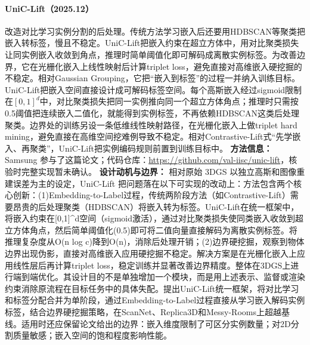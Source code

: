 \paragraph{UniC-Lift（2025.12）\cite{2512_24763}}
改造对比学习实例分割的后处理。传统方法学习嵌入后还要用HDBSCAN等聚类把嵌入转标签，慢且不稳定。UniC-Lift把嵌入约束在超立方体中，用对比聚类损失让同实例嵌入收敛到角点，推理时简单阈值化即可解码成离散实例标签。为改善边界，它在光栅化嵌入上线性映射后计算triplet loss，避免直接对高维嵌入硬挖掘的不稳定。相对Gaussian Grouping，它把“嵌入到标签”的过程一并纳入训练目标。
UniC-Lift把嵌入空间直接设计成可解码标签空间。每个高斯嵌入经过sigmoid限制在$[0,1]^d$中，对比聚类损失把同一实例推向同一个超立方体角点；推理时只需按0.5阈值把连续嵌入二值化，就能得到实例标签，不再依赖HDBSCAN这类后处理聚类。边界处的训练另设一条低维线性映射路径，在光栅化嵌入上做triplet hard mining，避免直接在高维空间挖难例导致不稳定。相对Contrastive-Lift式“先学嵌入、再聚类”，UniC-Lift把实例编码规则前置到训练目标中。
\textbf{方法信息：} Samsung 参与了这篇论文；代码仓库：\url{https://github.com/val-iisc/unic-lift}，核验时完整实现暂未确认。
\textbf{设计动机与边界：} 相对原始 3DGS 以独立高斯和图像重建误差为主的设定，UniC-Lift 把问题落在以下可实现的改动上：方法包含两个核心创新：(1)Embedding-to-Label过程，传统两阶段方法（如Contrastive-Lift）需要昂贵的后处理聚类（HDBSCAN）将嵌入转为标签。UniC-Lift在统一框架中，将嵌入约束在[0,1]\^{}d空间（sigmoid激活），通过对比聚类损失使同类嵌入收敛到超立方体角点，然后简单阈值化(0.5)即可将二值向量直接解码为离散实例标签。将推理复杂度从O(n log c)降到O(n)，消除后处理开销；(2)边界硬挖掘，观察到物体边界出现伪影，直接对高维嵌入应用硬挖掘不稳定。解决方案是在光栅化嵌入上应用线性层后再计算triplet loss，稳定训练并显著改善边界精度。整体在3DGS上进行端到端优化。其设计目的不是单独增加一个模块，而是用上述表示、监督或渲染约束消除原流程在目标任务中的具体失配。提出UniC-Lift统一框架，将对比学习和标签分配合并为单阶段，通过Embedding-to-Label过程直接从学习嵌入解码实例标签，结合边界硬挖掘策略，在ScanNet、Replica3D和Messy-Rooms上超越基线。适用时还应保留论文给出的边界：嵌入维度限制了可区分实例数量；对2D分割质量敏感；嵌入空间的饱和程度影响性能。
